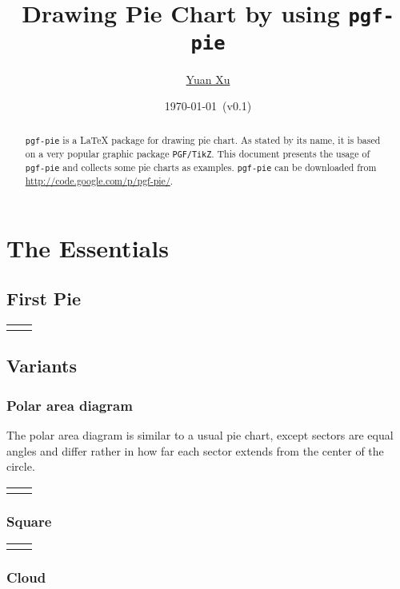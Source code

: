 \documentclass{article}
\newcommand{\demo}[2][1]{
  \begin{center}
  \begin{tabular}{cc}
    \begin{minipage}{.49\linewidth}
      \centering
      \resizebox{#1\linewidth}{!}{
        
      }
    \end{minipage}
    &
    \begin{minipage}{.45\linewidth}
      
    \end{minipage}
  \end{tabular}
  \end{center}
}
\begin{document}
\title{Drawing Pie Chart by using \texttt{pgf-pie}}
\author{\href{mailto:xuyuan.cn@gmail.com}{Yuan Xu}}
\date{\today{}~(v0.1)}
\maketitle

\begin{abstract}
  \texttt{pgf-pie} is a LaTeX package for drawing pie chart. As stated
  by its name, it is based on a very popular graphic package
  \texttt{PGF/TikZ}. This document presents the usage of
  \texttt{pgf-pie} and collects some pie charts as examples.
  \texttt{pgf-pie} can be downloaded from
  \href{http://code.google.com/p/pgf-pie/}{http://code.google.com/p/pgf-pie/}.
\end{abstract}

\tableofcontents

\section{The Essentials}

\subsection{First Pie}
\demo[0.6]{first-pie}

\subsection{Variants}
\subsubsection{Polar area diagram}
The polar area diagram is similar to a usual pie chart, except sectors
are equal angles and differ rather in how far each sector extends from
the center of the circle.

\demo[0.6]{polar}

\subsubsection{Square}

\demo[0.6]{square}

\subsubsection{Cloud}
\end{document}
